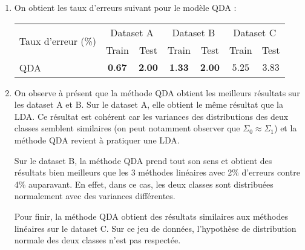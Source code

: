 \documentclass{article}
\begin{document}
\begin{enumerate}[label=(\alph*)]
\item On obtient les taux d'erreurs suivant pour le modèle QDA :
\begin{center}
\begin{tabular}{|l|c|c|c|c|c|c|}
\hline
\multirow{2}{*}{Taux d'erreur (\%)} & \multicolumn{2}{c|}{Dataset A} & \multicolumn{2}{c|}{Dataset B} & \multicolumn{2}{c|}{Dataset C}\\
& Train & Test & Train & Test & Train & Test\\
\hline
QDA & $\textbf{0.67}$ & $\textbf{2.00}$ & $\textbf{1.33}$ & $\textbf{2.00}$ & $5.25$ & $3.83$\\
\hline
\end{tabular}
\end{center}

\item On observe à présent que la méthode QDA obtient les meilleurs résultats sur les dataset A et B. Sur le dataset A, elle obtient le même résultat que la LDA. Ce résultat est cohérent car les variances des distributions des deux classes semblent similaires (on peut notamment observer que $\Sigma_0 \approx \Sigma_1$) et la méthode QDA revient à pratiquer une LDA. 

Sur le dataset B, la méthode QDA prend tout son sens et obtient des résultats bien meilleurs que les 3 méthodes linéaires avec 2\% d'erreurs contre 4\% auparavant. En effet, dans ce cas, les deux classes sont distribuées normalement avec des variances différentes. 

Pour finir, la méthode QDA obtient des résultats similaires aux méthodes linéaires sur le dataset C. Sur ce jeu de données, l'hypothèse de distribution normale des deux classes n'est pas respectée.
\end{enumerate}
\end{document}
